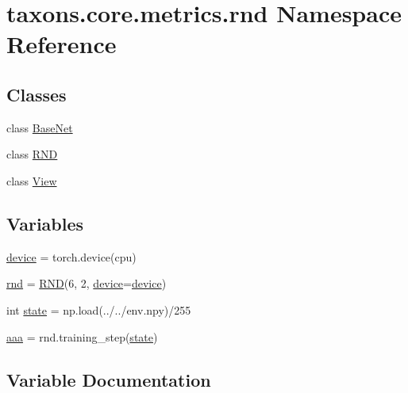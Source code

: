 \hypertarget{namespacetaxons_1_1core_1_1metrics_1_1rnd}{}\section{taxons.\+core.\+metrics.\+rnd Namespace Reference}
\label{namespacetaxons_1_1core_1_1metrics_1_1rnd}
\subsection*{Classes}
\begin{DoxyCompactItemize}
\item 
class \hyperlink{classtaxons_1_1core_1_1metrics_1_1rnd_1_1_base_net}{Base\+Net}
\item 
class \hyperlink{classtaxons_1_1core_1_1metrics_1_1rnd_1_1_r_n_d}{R\+ND}
\item 
class \hyperlink{classtaxons_1_1core_1_1metrics_1_1rnd_1_1_view}{View}
\end{DoxyCompactItemize}
\subsection*{Variables}
\begin{DoxyCompactItemize}
\item 
\hyperlink{namespacetaxons_1_1core_1_1metrics_1_1rnd_a4f16d4032b693046b0f8f90b6225cbb9}{device} = torch.\+device(\textquotesingle{}cpu\textquotesingle{})
\item 
\hyperlink{namespacetaxons_1_1core_1_1metrics_1_1rnd_ac25931921b617cf752a16505893653e6}{rnd} = \hyperlink{classtaxons_1_1core_1_1metrics_1_1rnd_1_1_r_n_d}{R\+ND}(6, 2, \hyperlink{namespacetaxons_1_1core_1_1metrics_1_1rnd_a4f16d4032b693046b0f8f90b6225cbb9}{device}=\hyperlink{namespacetaxons_1_1core_1_1metrics_1_1rnd_a4f16d4032b693046b0f8f90b6225cbb9}{device})
\item 
int \hyperlink{namespacetaxons_1_1core_1_1metrics_1_1rnd_abf164f38565dd3f7dc9213cfcaf6d467}{state} = np.\+load(\textquotesingle{}../../env.\+npy\textquotesingle{})/255
\item 
\hyperlink{namespacetaxons_1_1core_1_1metrics_1_1rnd_a1ac25d7b544f5624aa26e787edc5c124}{aaa} = rnd.\+training\+\_\+step(\hyperlink{namespacetaxons_1_1core_1_1metrics_1_1rnd_abf164f38565dd3f7dc9213cfcaf6d467}{state})
\end{DoxyCompactItemize}


\subsection{Variable Documentation}
